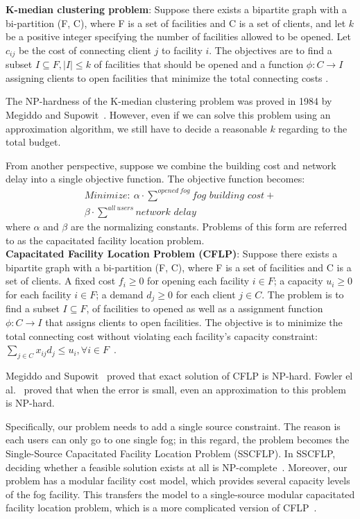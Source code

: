 \documentclass[10pt,journal,compsoc]{IEEEtran}
\begin{document}
\textbf{K-median clustering problem}: Suppose there exists a bipartite graph with a bi-partition (F, C), where F is a set of facilities and C is a set of clients, and let $k$ be a positive integer specifying the number of facilities allowed to be opened. Let $c_{ij}$ be the cost of connecting client $j$ to facility $i$. The objectives are to find a subset $I \subseteq F, |I| \leq k$ of facilities that should be opened and a function $\phi: C \to I$ assigning clients to open facilities that minimize the total connecting costs \cite{Vazirani:2001:AA:500776}.

The NP-hardness of the K-median clustering problem was proved in 1984 by Megiddo and Supowit~\cite{1984}. 
However, even if we can solve this problem using an approximation algorithm, we still have to decide a reasonable $k$ regarding to the total budget. 

From another perspective, suppose we combine the building cost and network delay into a single objective function. The objective function becomes:
\begin{align}
\textit{Minimize}: \ \alpha\cdot\overset{opened\ fog}{\sum} \textit{fog building cost} + \\
\beta \cdot \overset{all\ users}{\sum}\textit{network delay}\nonumber
\end{align}
where $\alpha$ and $\beta$ are the normalizing constants.
Problems of this form are referred to as the capacitated facility location problem.\\

\textbf{Capacitated Facility Location Problem (CFLP)}: Suppose there exists a bipartite graph with a bi-partition (F, C), where F is a set of facilities and C is a set of clients. A fixed cost $f_i \geq 0 $ for opening each facility $i \in F$; a capacity $u_i \geq 0 $ for each facility $i \in F$; a demand $d_j \geq 0$ for each client $j \in C$. The problem is to find a subset $I \subseteq F$, of facilities to opened as well as a assignment function $\phi: C \to I $ that assigns clients to open facilities. The objective is to minimize the total connecting cost without violating each facility's capacity constraint: $\sum_{j \in C} x_{ij} d_j \leq u_i,  \forall i \in F$~\cite{Vazirani:2001:AA:500776}. 

Megiddo and Supowit~\cite{1984} proved that exact solution of CFLP is NP-hard. Fowler el al.~\cite{FOWLER1981133} proved that when the error is small, even an approximation to this problem is NP-hard.

Specifically, our problem needs to add a single source constraint. The reason is each users can only go to one single fog; in this regard, the problem becomes the Single-Source Capacitated Facility Location Problem (SSCFLP). In SSCFLP, deciding whether a feasible solution exists at all is NP-complete~\cite{bonn}.
Moreover, our problem has a modular facility cost model, which provides several capacity levels of the fog facility. This transfers the model to a single-source modular capacitated facility location problem, which is a more complicated version of CFLP~\cite{bonn}.
\end{document}
